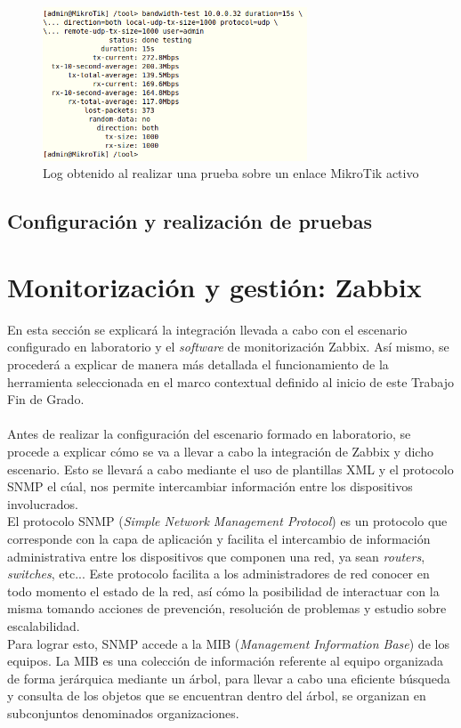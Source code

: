 \begin{figure}[H]
	\centering
	\includegraphics[width=0.7\textwidth]{img/log_test.png}
	\caption{Log obtenido al realizar una prueba sobre un enlace MikroTik activo}
	\label{logTest}
\end{figure}

\subsection{Configuración y realización de pruebas}

\section{Monitorización y gestión: Zabbix}
En esta sección se explicará la integración llevada a cabo con el escenario configurado en laboratorio y el \textit{software} de monitorización Zabbix. Así mismo, se procederá a explicar de manera más detallada el funcionamiento de la herramienta seleccionada en el marco contextual definido al inicio de este Trabajo Fin de Grado.\\\\

Antes de realizar la configuración del escenario formado en laboratorio, se procede a explicar cómo se va a llevar a cabo la integración de Zabbix y dicho escenario. Esto se llevará a cabo mediante el uso de plantillas XML y el protocolo SNMP el cúal, nos permite intercambiar información entre los dispositivos involucrados.\\
 
El protocolo SNMP (\textit{Simple Network Management Protocol}) es un protocolo que corresponde con la capa de aplicación y facilita el intercambio de información administrativa entre los dispositivos que componen una red, ya sean \textit{routers}, \textit{switches}, etc... Este protocolo facilita a los administradores de red conocer en todo momento el estado de la red, así cómo la posibilidad de interactuar con la misma tomando acciones de prevención, resolución de problemas y estudio sobre escalabilidad.\\
Para lograr esto, SNMP accede a la MIB (\textit{Management Information Base}) de los equipos. La MIB es una colección de información referente al equipo organizada de forma jerárquica mediante un árbol, para llevar a cabo una eficiente búsqueda y consulta de los objetos que se encuentran dentro del árbol, se organizan en subconjuntos denominados organizaciones.\\\\

